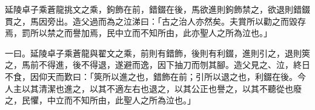 \begin{pinyinscope}
延陵卓子乘蒼龍挑文之乘，鉤飾在前，錯錣在後，馬欲進則鉤飾禁之，欲退則錯錣貫之，馬因旁出。造父過而為之泣涕曰：「古之治人亦然矣。夫賞所以勸之而毀存焉，罰所以禁之而譽加焉，民中立而不知所由，此亦聖人之所為泣也。」

一曰。延陵卓子乘蒼龍與翟文之乘，前則有錯飾，後則有利錣，進則引之，退則筴之，馬前不得進，後不得退，遂避而逸，因下抽刀而刎其腳。造父見之、泣，終日不食，因仰天而歎曰：「筴所以進之也，錯飾在前；引所以退之也，利錣在後。今人主以其清潔也進之，以其不適左右也退之，以其公正也譽之，以其不聽從也廢之，民懼，中立而不知所由，此聖人之所為泣也。」


\end{pinyinscope}
